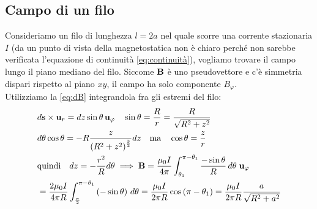 \subsection{Campo di un filo}
Consideriamo un filo di lunghezza $ l = 2a $ nel quale scorre una corrente stazionaria $ I $ (da un punto di vista della magnetostatica non è chiaro 
perché non sarebbe verificata l'equazione di continuità \eqref{eq:continuità}), vogliamo trovare il campo lungo il piano mediano del filo.
Siccome $ \mathbf{ B } $ è uno pseudovettore e c'è simmetria dispari rispetto al piano $ xy $, il campo ha solo componente $ B_{\varphi} $.\\
Utilizziamo la \eqref{eq:dB} integrandola fra gli estremi del filo:
\begin{align}
  & d\mathbf{ s } \times \mathbf{ u }_r = dz \sin \theta \, \mathbf{ u }_{\varphi}   \quad \sin\theta = \frac{R}{r} = \frac{R}{\sqrt{R^2 + z^2}}\\
  & d\theta \cos\theta = - R \frac{z}{\left( R^2 + z^2 \right)^{\frac{3}{2}}} dz \quad \text{ma}\quad \cos\theta =  \frac{z}{r} \\
  & \text{quindi} \quad dz = -\frac{r^2}{R} d\theta \implies \mathbf{ B } 
  =  \frac{\mu_0 I}{4\pi} \int_{\theta_1}^{\pi-\theta_1} \frac{-\sin\theta}{R} \,d\theta \; \mathbf{ u }_{\varphi} \\
  & = \frac{2\mu_0 I}{4\pi R} \int_{\frac{\pi}{2}}^{\pi-\theta_1} \left( -\sin\theta \right) \,d\theta 
  = \frac{\mu_0 I}{2\pi R} \cos \left( \pi -\theta_1 \right) 
  = \frac{\mu_0 I}{2\pi R} \frac{a}{\sqrt{R^2 + a^2}} \label{eq:campo_filo_lunghezza_a}
\end{align}


